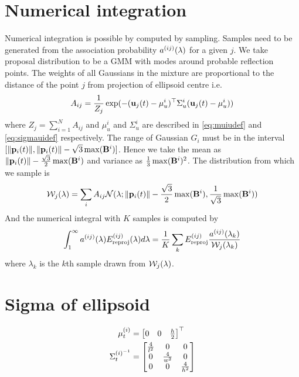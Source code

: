 \section{Numerical integration}
Numerical integration is possible by computed by sampling. Samples need to be
generated from the association probability $a^{(ij)}(\lambda)$ for a given $j$. We take
proposal distribution to be a GMM with modes around probable reflection points.
The weights of all Gaussians in the mixture are proportional to the distance of
the point $j$ from projection of ellipsoid centre i.e. 
\begin{align}
  A_{ij} = \frac{1}{Z_j}\exp(-(\mathbf{u}_j(t) - \mu^i_u)^\top\Sigma_u^i(\mathbf{u}_j(t) - \mu^i_u))
\end{align}
where $Z_j = \sum_{i=1}^N A_{ij}$ and $\mu^i_u$ and $\Sigma_u^i$ are described in \eqref{eq:muiudef} and \eqref{eq:sigmauidef} respectively.
The range of Gaussian $G_i$
must be in the interval $[\|\mathbf{p}_{i}({t})\|, \|\mathbf{p}_{i}({t})\| -
\sqrt{3}\max(\mathbf{B}^{i})]$. Hence we take the mean as $\|\mathbf{p}_{i}({t})\| -
\frac{\sqrt{3}}{2}\max(\mathbf{B}^{i})$ and variance as
$\frac{1}{3}\max(\mathbf{B}^{i})^2$. The distribution from which we sample is 
\begin{align}
  \mathcal{W}_j(\lambda) = \sum_i A_{ij} \mathcal{N}(\lambda; \|\mathbf{p}_{i}({t})\| -
  \frac{\sqrt{3}}{2}\max(\mathbf{B}^{i}), \frac{1}{\sqrt{3}}\max(\mathbf{B}^{i}))
\end{align}
And the numerical integral with $K$ samples is computed by
\begin{align}
    \int_1^{\infty}
    a^{(ij)}(\lambda)
    E^{(ij)}_{\text{reproj}}(\lambda)
    d\lambda
    =
    \frac{1}{K}\sum_k E^{(ij)}_{\text{reproj}} \frac{a^{(ij)}(\lambda_k)}{\mathcal{W}_j(\lambda_k)}
\end{align}
where $\lambda_k$ is the $k$th sample drawn from $\mathcal{W}_j(\lambda)$.

\section{Sigma of ellipsoid}
\label{sec:sigmacomputation}

\begin{align}
  \mu^{(i)}_t &= \begin{bmatrix}
  0& 0& \frac{h}{2}
  \end{bmatrix}^\top\\
  \Sigma^{(i)^{-1}}_t &= \begin{bmatrix}
    \frac{4}{l^2} & 0 & 0 \\
    0 & \frac{4}{w^2} & 0 \\
    0 & 0 & \frac{4}{h^2}
  \end{bmatrix}
\end{align}

